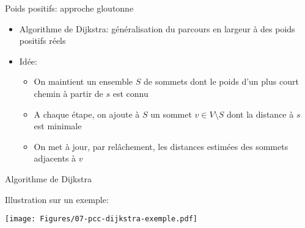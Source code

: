 \begin{frame}{Poids positifs: approche gloutonne}

\begin{itemize}
\item Algorithme de Dijkstra: généralisation du parcours en largeur à
  des poids positifs réels

\bigskip

\item Idée:
\begin{itemize}
\item On maintient un ensemble $S$ de sommets dont le poids d'un plus
  court chemin à partir de $s$ est connu
\item A chaque étape, on ajoute à $S$ un sommet $v\in V\setminus S$ dont la distance à $s$ est minimale
\item On met à jour, par relâchement, les distances estimées des sommets adjacents à $v$
\end{itemize}
\end{itemize}

\end{frame}

\begin{frame}{Algorithme de Dijkstra}

\begin{center}
{\small
{}
}
\end{center}

\bigskip

Illustration sur un exemple:

\centerline{\texttt{[image: Figures/07-pcc-dijkstra-exemple.pdf]}}

\end{frame}


